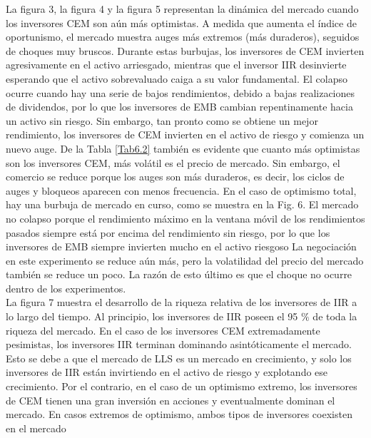 \documentclass[12pt,a4paper]{article}
\begin{document}
\quad La figura 3, la figura 4 y la figura 5 representan la dinámica del mercado cuando los inversores CEM son aún más optimistas. A medida que aumenta el índice de oportunismo, el mercado muestra auges más extremos (más duraderos), seguidos de choques muy bruscos. Durante estas burbujas, los inversores de CEM invierten agresivamente en el activo arriesgado, mientras que el inversor IIR desinvierte esperando que el activo sobrevaluado caiga a su valor fundamental. El colapso ocurre cuando hay una serie de bajos rendimientos, debido a bajas realizaciones de dividendos, por lo que los inversores de EMB cambian repentinamente hacia un activo sin riesgo. Sin embargo, tan pronto como se obtiene un mejor rendimiento, los inversores de CEM invierten en el activo de riesgo y comienza un nuevo auge. De la Tabla \ref{Tab6.2} también es evidente que cuanto más optimistas son los inversores CEM, más volátil es el precio de mercado. Sin embargo, el comercio se reduce porque los auges son más duraderos, es decir, los ciclos de auges y bloqueos aparecen con menos frecuencia. En el caso de optimismo total, hay una burbuja de mercado en curso, como se muestra en la Fig. 6. 
El mercado no colapso porque el rendimiento máximo en la ventana móvil de los rendimientos pasados siempre está por encima del rendimiento sin riesgo, por lo que los inversores de EMB siempre invierten mucho en el activo riesgoso La negociación en este experimento se reduce aún más, pero la volatilidad del precio del mercado también se reduce un poco. La razón de esto último es que el choque no ocurre dentro de los experimentos.\\
\quad La figura 7 muestra el desarrollo de la riqueza relativa de los inversores de IIR a lo largo del tiempo. Al principio, los inversores de IIR poseen el 95 $\%$ de toda la riqueza del mercado. En el caso de los inversores CEM extremadamente pesimistas, los inversores IIR terminan dominando asintóticamente el mercado. Esto se debe a que el mercado de LLS es un mercado en crecimiento, y solo los inversores de IIR están invirtiendo en el activo de riesgo y explotando ese crecimiento. Por el contrario, en el caso de un optimismo extremo, los inversores de CEM tienen una gran inversión en acciones y eventualmente dominan el mercado. En casos extremos de optimismo, ambos tipos de inversores coexisten en el mercado
\nocite{*} 
\newpage


\end{document}
